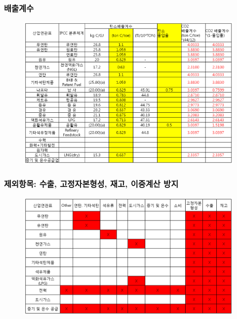 \documentclass[10pt,compress,slidetop,%
			   hyperref={unicode},xcolor={svgnames},%
			   t]{beamer}
\begin{document}
\begin{frame}
	\frametitle{배출계수}
	  	\begin{figure}
	\centering
	 \includegraphics[width=1.00\textwidth]{ECform.png}
	\end{figure}	
	
\end{frame}


\begin{frame}
	\frametitle{제외항목: 수출, 고정자본형성, 재고, 이중계산 방지}
	  	\begin{figure}
	\centering
	 \includegraphics[width=1.00\textwidth]{noncount.png}
	\end{figure}	
	
\end{frame}
\end{document}
